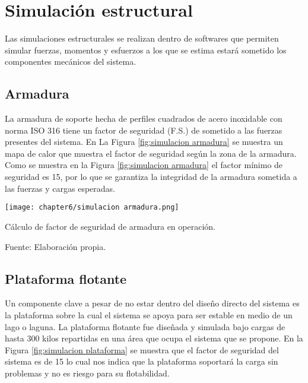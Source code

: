 \section{Simulación estructural}

Las simulaciones estructurales se realizan dentro de softwares que permiten simular fuerzas, momentos y esfuerzos a los que se estima estará sometido los componentes mecánicos del sistema.

\subsection{Armadura}

La armadura de soporte hecha de perfiles cuadrados de acero inoxidable con norma ISO 316 tiene un factor de seguridad (F.S.) de sometido a las fuerzas presentes del sistema. En La Figura \ref{fig:simulacion armadura} se muestra un mapa de calor que muestra el factor de seguridad según la zona de la armadura. Como se muestra en la Figura  \ref{fig:simulacion armadura} el factor mínimo de seguridad es 15, por lo que se garantiza la integridad de la armadura sometida a las fuerzas y cargas esperadas.

\begin{myfigure}[H]
	\footnotesize\centering
	\texttt{[image: chapter6/simulacion armadura.png]}
	\caption{Cálculo de factor de seguridad de armadura en operación.}
	\begin{myflushcenter}
		Fuente: Elaboración propia.
	\end{myflushcenter}
	\label{fig:simulacion armadura}
\end{myfigure}


\subsection{Plataforma flotante}

Un componente clave a pesar de no estar dentro del diseño directo del sistema es la plataforma sobre la cual el sistema se apoya para ser estable en medio de un lago o laguna. La plataforma flotante fue diseñada y simulada bajo cargas de hasta 300 kilos repartidas en una área que ocupa el sistema que se propone. En la Figura \ref{fig:simulacion plataforma} se muestra que el factor de seguridad del sistema es de 15 lo cual nos indica que la plataforma soportará la carga sin problemas y no es riesgo para su flotabilidad.

